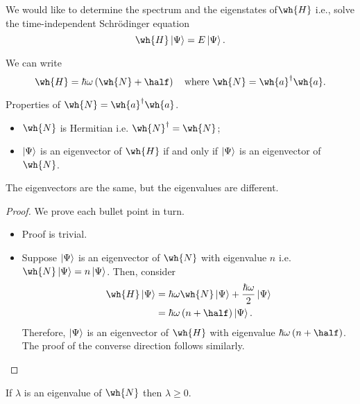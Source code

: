 \documentclass[12pt, a4paper]{article}
\begin{document}
We would like to determine the spectrum and the eigenstates of\(\wh{H}\) i.e., solve the time-independent Schrödinger equation 
\[\wh{H} \ket{\Psi} = E \ket{\Psi}.\]

We can write
\[\wh{H}=\hbar\omega \left(\wh{N} +\half\right) \quad \text{where } \wh{N}=\wh{a}^{\dagger}\wh{a}.\]

\begin{proposition}
    Properties of \(\wh{N}=\wh{a}^{\dagger}\wh{a}\).
    \begin{itemize}
        \item \(\wh{N}\) is Hermitian i.e. \(\wh{N}^{\dagger}=\wh{N}\);
        \item \(\ket{\Psi}\) is an eigenvector of \(\wh{H}\) if and only if \(\ket{\Psi}\) is an eigenvector of \(\wh{N}\).
    \end{itemize}
\end{proposition}

\begin{mdnote}
    The eigenvectors are the same, but the eigenvalues are different.
\end{mdnote}

\begin{proof}
    We prove each bullet point in turn.
    \begin{itemize}
        \item Proof is trivial. 
        \item Suppose \(\ket{\Psi}\) is an eigenvector of \(\wh{N}\) with eigenvalue \(n\) i.e. \(\wh{N} \ket{\Psi} = n \ket{\Psi}\). Then, consider
        \[\begin{aligned}
            \wh{H} \ket{\Psi} &= \hbar \omega \wh{N} \ket{\Psi}+\frac{\hbar \omega}{2} \ket{\Psi} \\
            &= \hbar \omega \left( n+\half \right) \ket{\Psi}.
        \end{aligned}\]
        Therefore, \(\ket{\Psi}\) is an eigenvector of \(\wh{H}\) with eigenvalue \(\hbar\omega\left(n+\half\right)\). The proof of the converse direction follows similarly.
    \end{itemize}
\end{proof}

\begin{mdlemma}
    If \(\lambda\) is an eigenvalue of \(\wh{N}\) then \(\lambda \geq 0\).
\end{mdlemma}
\end{document}

